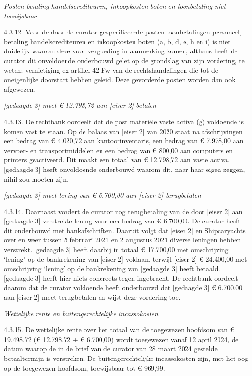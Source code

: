 \documentclass[
  dutch,
  a4paper,
]{article}
\begin{document}
\emph{Posten betaling handelscrediteuren, inkoopkosten boten en loonbetaling niet toewijsbaar}

4.3.12. Voor de door de curator gespecificeerde posten loonbetalingen personeel, betaling handelscrediteuren en inkoopkosten boten (a, b, d, e, h en i) is niet duidelijk waarom deze voor vergoeding in aanmerking komen, althans heeft de curator dit onvoldoende onderbouwd gelet op de grondslag van zijn vordering, te weten: vernietiging ex artikel 42 Fw van de rechtshandelingen die tot de oneigenlijke doorstart hebben geleid. Deze gevorderde posten worden dan ook afgewezen.

\emph{{[}gedaagde 3{]} moet € 12.798,72 aan {[}eiser 2{]} betalen}

4.3.13. De rechtbank oordeelt dat de post materiële vaste activa (g) voldoende is komen vast te staan. Op de balans van {[}eiser 2{]} van 2020 staat na afschrijvingen een bedrag van € 4.020,72 aan kantoorinventaris, een bedrag van € 7.978,00 aan vervoer- en transportmiddelen en een bedrag van € 800,00 aan computers en printers geactiveerd. Dit maakt een totaal van € 12.798,72 aan vaste activa. {[}gedaagde 3{]} heeft onvoldoende onderbouwd waarom dit, naar haar eigen zeggen, nihil zou moeten zijn.

\emph{{[}gedaagde 3{]} moet lening van € 6.700,00 aan {[}eiser 2{]} terugbetalen}

4.3.14. Daarnaast vordert de curator nog terugbetaling van de door {[}eiser 2{]} aan {[}gedaagde 3{]} verstrekte lening voor een bedrag van € 6.700,00. De curator heeft dit onderbouwd met bankafschriften. Daaruit volgt dat {[}eiser 2{]} en Shipcaryachts over en weer tussen 5 februari 2021 en 2 augustus 2021 diverse leningen hebben verstrekt. {[}gedaagde 3{]} heeft daarbij in totaal € 17.700,00 met omschrijving `lening' op de bankrekening van {[}eiser 2{]} voldaan, terwijl {[}eiser 2{]} € 24.400,00 met omschrijving `lening' op de bankrekening van {[}gedaagde 3{]} heeft betaald. {[}gedaagde 3{]} heeft hier niets concreets tegen ingebracht. De rechtbank oordeelt daarom dat de curator voldoende heeft onderbouwd dat {[}gedaagde 3{]} € 6.700,00 aan {[}eiser 2{]} moet terugbetalen en wijst deze vordering toe.

\emph{Wettelijke rente en buitengerechtelijke incassokosten}

4.3.15. De wettelijke rente over het totaal van de toegewezen hoofdsom van € 19.498,72 (€ 12.798,72 + € 6.700,00) wordt toegewezen vanaf 12 april 2024, de datum waarop de in de brief van de curator van 28 maart 2024 gestelde betaaltermijn is verstreken. De buitengerechtelijke incassokosten zijn, met het oog op de toegewezen hoofdsom, toewijsbaar tot € 969,99.
\end{document}
